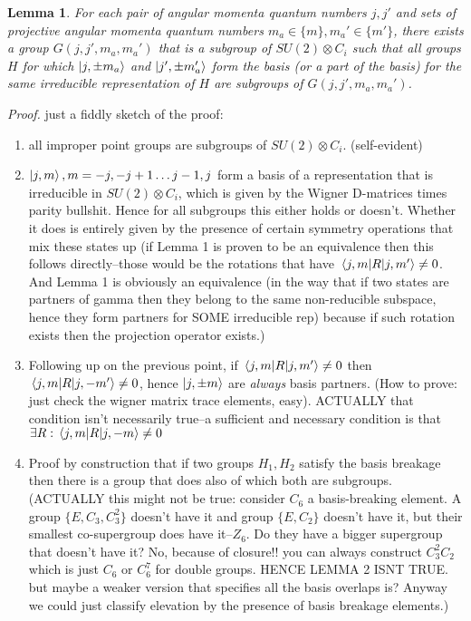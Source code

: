 \documentclass[12pt]{article}
\newtheorem{largest_basis_subgroup}
{Lemma}
\begin{document}
	\begin{largest_basis_subgroup}
	For each pair of angular momenta quantum numbers $j, j'$ and sets of projective angular momenta quantum numbers $m_a\in\{m\}, m_a'\in\{m'\}$, there exists a group $G(j,j',m_a,m_a')$ that is a subgroup of $SU(2)\otimes C_i$ such that all groups $H$ for which $\ket{j,\pm m_a}$ and $\ket{j',\pm m_a'}$ form the basis (or a part of the basis) for the same irreducible representation of $H$ are subgroups of $G(j,j',m_a,m_a')$.
	\end{largest_basis_subgroup}
	\textit{Proof.} just a fiddly sketch of the proof:
	\begin{enumerate}
	\item all improper point groups are subgroups of $SU(2)\otimes C_i$. (self-evident)
	\item $\ket{j,m}, m=-j,-j+1\dots j-1, j$ form a basis of a representation that is irreducible in $SU(2)\otimes C_i$, which is given by the Wigner D-matrices times parity bullshit. Hence for all subgroups this either holds or doesn't. Whether it does is entirely given by the presence of certain symmetry operations that mix these states up (if Lemma 1 is proven to be an equivalence then this follows directly--those would be the rotations that have $\mel{j,m}{R}{j,m'}\neq 0$. And Lemma 1 is obviously an equivalence (in the way that if two states are partners of gamma then they belong to the same non-reducible subspace, hence they form partners for SOME irreducible rep) because if such rotation exists then the projection operator exists.)
	\item Following up on the previous point, if $\mel{j,m}{R}{j,m'}\neq 0$ then $\mel{j,m}{R}{j,-m'}\neq 0$, hence $\ket{j,\pm m}$ are \textit{always} basis partners. (How to prove: just check the wigner matrix trace elements, easy). ACTUALLY that condition isn't necessarily true--a sufficient and necessary condition is that $\exists R:\mel{j,m}{R}{j,-m}\neq 0$
	\item Proof by construction that if two groups $H_1, H_2$ satisfy the basis breakage then there is a group that does also of which both are subgroups. (ACTUALLY this might not be true: consider $C_6$ a basis-breaking element. A group $\{E, C_3, C_3^2\}$ doesn't have it and group $\{E, C_2\}$ doesn't have it, but their smallest co-supergroup does have it--$Z_6$. Do they have a bigger supergroup that doesn't have it? No, because of closure!! you can always construct $C_3^2C_2$ which is just $C_6$ or $C_6^7$ for double groups. HENCE LEMMA 2 ISNT TRUE. but maybe a weaker version that specifies all the basis overlaps is? Anyway we could just classify elevation by the presence of basis breakage elements.)
	\end{enumerate}
	
	
\end{document}
